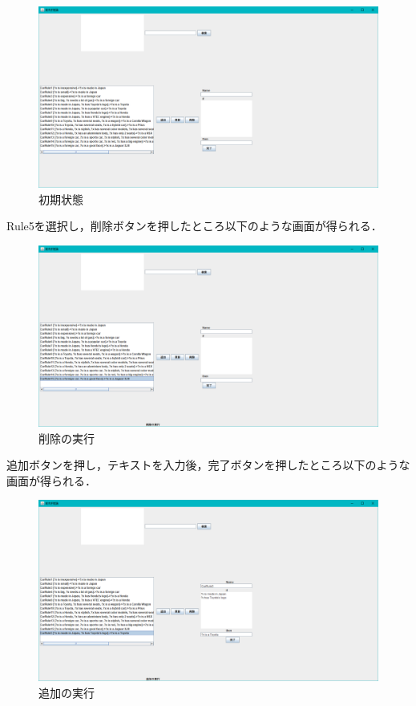 \documentclass[12pt]{jarticle}
\begin{document}
\begin{figure}[!hbt]
  	\begin{center}
  		\includegraphics[scale=0.35]{images/gui1.png}
	\end{center}
  	\caption{初期状態}
\end{figure}
\clearpage

Rule5を選択し，削除ボタンを押したところ以下のような画面が得られる．

\begin{figure}[!hbt]
  	\begin{center}
  		\includegraphics[scale=0.35]{images/gui5.png}
	\end{center}
  	\caption{削除の実行}
\end{figure}
\clearpage

追加ボタンを押し，テキストを入力後，完了ボタンを押したところ以下のような画面が得られる．

\begin{figure}[!hbt]
  	\begin{center}
  		\includegraphics[scale=0.35]{images/gui6.png}
	\end{center}
  	\caption{追加の実行}
\end{figure}
\clearpage
\end{document}
